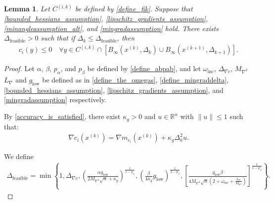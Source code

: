 \documentclass{article}
\newtheorem{lemma}[theorem]{Lemma}
\theoremstyle{case}
\numberwithin{theorem}{subsection}
\newcommand{\dfeas}{{\Delta_{\textrm{feasible}}}}
\newcommand{\dk}{\Delta_k}
\newcommand{\dkpo}{\Delta_{k+1}}
\newcommand{\lipgrad}{{L_{\nabla}}}
\newcommand{\maxhessian}{{M_{\nabla^2}}}
\newcommand{\mingraddelta}{{\Delta_{\nabla c}}}
\newcommand{\mingrad}{{ g_{\textrm{low}} }}
\newcommand{\omegainc}{\omega_{\text{inc}}}
\newcommand{\Rn}{\mathbb R^n}
\newcommand{\tr}{{ B_{\infty}\left(\xk, \dk\right) }}
\newcommand{\trkpo}{{ B_{\infty}\left(\xkpo, \dkpo\right) }}
\newcommand{\xkpo}{{{x}^{(k+1)}}}
\newcommand{\xk}{x^{(k)}}
\newcommand{\fik}{{C^{(i, k)}}}
\begin{document}
\begin{lemma}
\label{each_constraints_cone_is_feasible}
Let $\fik$ be defined by \cref{define_fik}.
Suppose that 
\cref{bounded_hessians_assumption},
\cref{lipschitz_gradients_assumption},
\cref{minangleassumption_alt},
and \cref{mingradassumption} hold.
There exists $\dfeas > 0$ such that
if $\dk \le \dfeas$, then
\begin{align*}
c_i(y) \le 0 \quad \forall y \in \fik \cap \left[\tr \cup \trkpo\right].
\end{align*}
\end{lemma}

\begin{proof}
Let
$\alpha$, $\beta$, $p_{\alpha}$, and $p_{\beta}$
be defined by
\cref{define_abpab},
and let
$\omegainc$,
$\mingraddelta$,
$\maxhessian$
$\lipgrad$
and $\mingrad$
be defined as in
\cref{define_the_omegas},
\cref{define_mingraddelta},
\cref{bounded_hessians_assumption},
\cref{lipschitz_gradients_assumption},
and \cref{mingradassumption}
respectively.

By \cref{accuracy_is_satisfied}, there exist $\kappa_g > 0$ and $u\in\Rn$ with $\|u\|\le 1$ such that:
\begin{align}
\nabla c_i(\xk) = \nabla m_{c_i}(\xk) + \kappa_g\dk^2 u. \label{model_error_for_gradient}
\end{align}

We define
\begin{align}
\dfeas = \min\left\{
1,
\mingraddelta,
\left(\frac{\alpha \mingrad}{2 \maxhessian \sqrt{n} + \kappa_g}\right)^{\frac 1 {1-p_{\alpha}}},
\left(\frac{\beta}{4\kappa_g}\mingrad\right)^{\frac 1 {2 - p_{\beta}}},
\left[\frac {\mingrad  \beta} {4\maxhessian\sqrt{n}\left(2 + \omegainc + \frac {\lipgrad} \maxhessian \right)}\right]^{\frac1 {1 - p_{\beta}} }
\right\}. \label{define_delta_feasible}
\end{align}




\end{proof}
\end{document}
